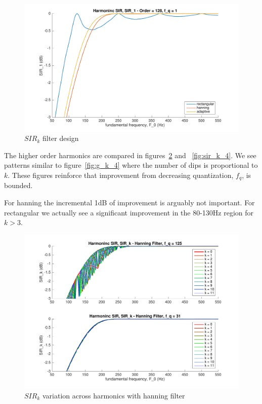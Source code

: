 \documentclass [11pt, proquest,oneside] {ganter_thesis}[2015/03/03]
\begin{document}
\begin{figure}[!ht]
  \centering
    \includegraphics[width=1\textwidth]{sir_k_2}
    \caption{$SIR_k$ filter design}\label{fig:sir_k_2}
\end{figure}

The higher order harmonics are compared in figures~\ref{fig:sir_k_3} and ~\ref{fig:sir_k_4}.  We see patterns similar to figure~\ref{fig:g_k_4} where the number of dips is proportional to $k$.  These figures reinforce that improvement from decreasing quantization, $f_q$, is bounded.

For hanning the incremental 1dB of improvement is arguably not important.  For rectangular we actually see a significant improvement in the 80-130Hz region for $k > 3$.

\begin{figure}[!ht]
  \centering
    \includegraphics[width=.8\textwidth]{sir_k_3}
    \caption{$SIR_k$ variation across harmonics with hanning filter}\label{fig:sir_k_3}
\end{figure}
\end{document}
